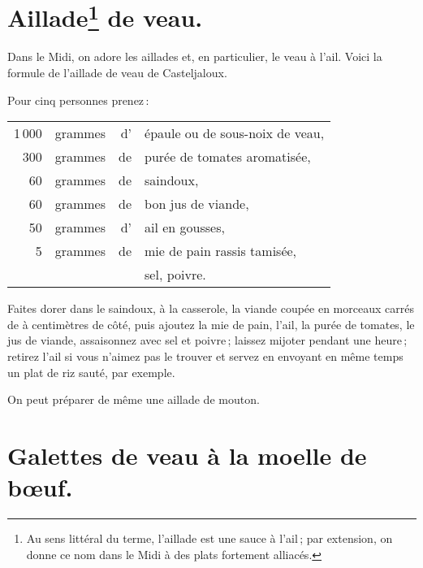 \section*{\centering Aillade\footnote{ Au sens littéral du terme, l'aillade est
une sauce à l'ail ; par extension, on donne ce nom dans le Midi à des plats
fortement alliacés.} de veau.}
{}

Dans le Midi, on adore les aillades et, en particulier, le veau à l'ail. Voici la
formule de l'aillade de veau de Casteljaloux.

\medskip

Pour cinq personnes prenez :

\footnotesize
\begin{longtable}{rrrp{16em}}
  1 000 & grammes & d' & épaule ou de sous-noix de veau,                                                  \\
    300 & grammes & de & purée de tomates aromatisée,                                                     \\
     60 & grammes & de & saindoux,                                                                        \\
     60 & grammes & de & bon jus de viande,                                                               \\
     50 & grammes & d' & ail en gousses,                                                                  \\
      5 & grammes & de & mie de pain rassis tamisée,                                                      \\
        &         &    & sel, poivre.                                                                     \\
\end{longtable}
\normalsize


Faites dorer dans le saindoux, à la casserole, la viande coupée en morceaux
carrés de {\mmm} à {\mmm} centimètres de côté, puis ajoutez la mie de pain, l'ail, la
purée de tomates, le jus de viande, assaisonnez avec sel et poivre ; laissez
mijoter pendant une heure ; retirez l'ail si vous n'aimez pas le trouver et
servez en envoyant en même temps un plat de riz sauté, par exemple.

\sk

On peut préparer de même une aillade de mouton.

\section*{\centering Galettes de veau à la moelle de bœuf.}
{}

